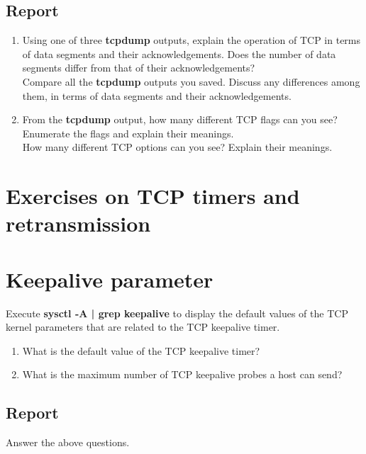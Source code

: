 \documentclass{../UTNetLab}
\begin{document}
    \subsection*{Report}
    \begin{enumerate}
        \item Using one of three \textbf{tcpdump} outputs, explain the operation of TCP in terms of data segments and their acknowledgements. Does the number of data segments differ from that of their acknowledgements? \\
        Compare all the \textbf{tcpdump} outputs you saved.
        Discuss any differences among them, in terms of data segments and their acknowledgements.
        \item From the \textbf{tcpdump} output, how many different TCP flags can you see? Enumerate the flags and explain their meanings. \\
        How many different TCP options can you see?
        Explain their meanings.
    \end{enumerate}

\section*{Exercises on TCP timers and retransmission}
\section{Keepalive parameter}
    Execute \textbf{sysctl -A | grep keepalive} to display the default values of the TCP kernel parameters that are related to the TCP keepalive timer. \\
    \begin{enumerate}
        \item What is the default value of the TCP keepalive timer?
        \item What is the maximum number of TCP keepalive probes a host can send?
    \end{enumerate}
    \subsection*{Report}
    Answer the above questions.
\end{document}
